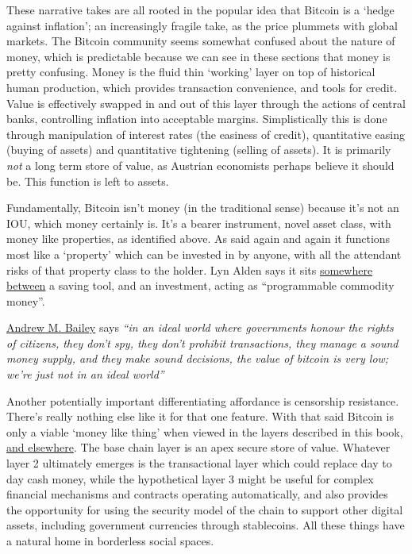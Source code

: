 These narrative takes are all rooted in the popular idea that Bitcoin is a `hedge against inflation'; an increasingly fragile take, as the price plummets with global markets. The Bitcoin community seems somewhat confused about the nature of money, which is predictable because we can see in these sections that money is pretty confusing. Money is the fluid thin `working' layer on top of historical human production, which provides transaction convenience, and tools for credit. Value is effectively swapped in and out of this layer through the actions of central banks, controlling inflation into acceptable margins. Simplistically this is done through manipulation of interest rates (the easiness of credit), quantitative easing (buying of assets) and quantitative tightening (selling of assets). It is primarily \textit{not} a long term store of value, as Austrian economists perhaps believe it should be. This function is left to assets.\par 
Fundamentally, Bitcoin isn't money (in the traditional sense) because it's not an IOU, which money certainly is. It's a bearer instrument, novel asset class, with money like properties, as identified above. As said again and again it functions most like a `property' which can be invested in by anyone, with all the attendant risks of that property class to the holder. Lyn Alden says it sits \href{https://www.lynalden.com/what-is-money/}{somewhere between} a saving tool, and an investment, acting as ``programmable commodity money''.\par 
\href{https://andrewmbailey.com/}{Andrew M. Bailey} says \textit{``in an ideal world where governments honour the rights of citizens, they don't spy, they don't prohibit transactions, they manage a sound money supply, and they make sound decisions, the value of bitcoin is very low; we're just not in an ideal world''}\par
Another potentially important differentiating affordance is censorship resistance. There's really nothing else like it for that one feature. With that said Bitcoin is only a viable `money like thing' when viewed in the layers described in this book, \href{https://giacomozucco.com/layers-before-bitcoin}{and elsewhere}\cite{Bhatia2021}. The base chain layer is an apex secure store of value. Whatever layer 2 ultimately emerges is the transactional layer which could replace day to day cash money, while the hypothetical layer 3 might be useful for complex financial mechanisms and contracts operating automatically, and also provides the opportunity for using the security model of the chain to support other digital assets, including government currencies through stablecoins. All these things have a natural home in borderless social spaces.
